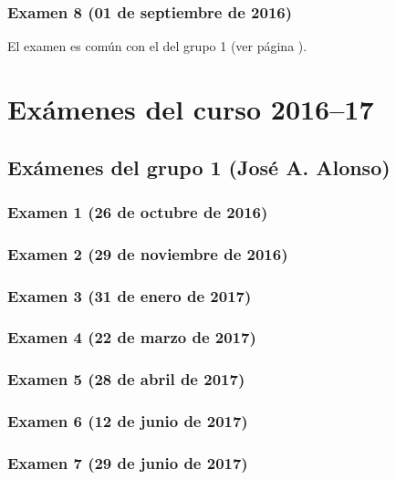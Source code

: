 \documentclass[a4paper,12pt,twoside]{book}
\begin{document}
\subsection{Examen 8 (01 de septiembre de 2016)}
El examen es común con el del grupo 1 (ver página \pageref{examen_15_16_4_8}).

\chapter{Exámenes del curso 2016--17}

\section{Exámenes del grupo 1 (José A. Alonso)}
\subsection{Examen 1 (26 de octubre de 2016)}
\subsection{Examen 2 (29 de noviembre de 2016)}
\subsection{Examen 3 (31 de enero de 2017)}
 \label{examen_16_17_4_3}
\subsection{Examen 4 (22 de marzo de 2017)}
\subsection{Examen 5 (28 de abril de 2017)}
\subsection{Examen 6 (12 de junio de 2017)}
 \label{examen_16_17_4_6}
\subsection{Examen 7 (29 de junio de 2017)}
  \label{examen_16_17_4_7}
\end{document}

